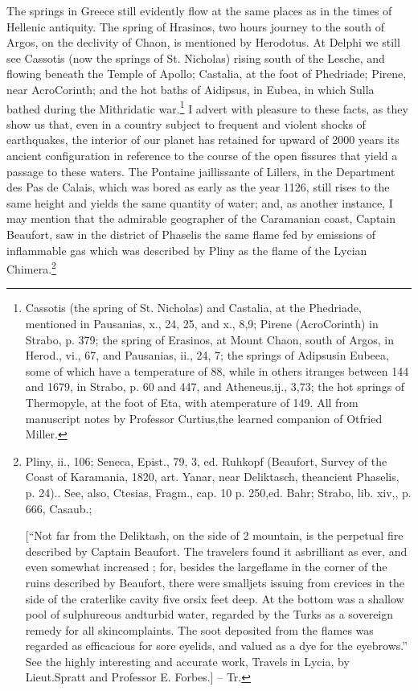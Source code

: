 The springs in Greece still evidently flow at the same places as in the times of Hellenic antiquity. The spring of Hrasinos, two hours journey to the south of Argos, on the declivity of Chaon, is mentioned by Herodotus. At Delphi we still see Cassotis (now the springs of St. Nicholas) rising south of the Lesche, and flowing beneath the Temple of Apollo; Castalia, at the foot of Phedriade; Pirene, near AcroCorinth; and the hot baths of Aidipsus, in Eubea, in which Sulla bathed during the Mithridatic war.\footnote{Cassotis (the spring of St. Nicholas) and Castalia, at the Phedriade, mentioned in Pausanias, x., 24, 25, and x., 8,9; Pirene (AcroCorinth) in Strabo, p. 379; the spring of Erasinos, at Mount Chaon, south of Argos, in Herod., vi., 67, and Pausanias, ii., 24, 7; the springs of Adipsusin Eubeea, some of which have a temperature of 88, while in others itranges between 144 and 1679, in Strabo, p. 60 and 447, and Atheneus,ij., 3,73; the hot springs of Thermopyle, at the foot of Eta, with atemperature of 149. All from manuscript notes by Professor Curtius,the learned companion of Otfried Miller.} I advert with pleasure to these facts, as they show us that, even in a country subject to frequent and violent shocks of earthquakes, the interior of our planet has retained for upward of 2000 years its ancient configuration in reference to the course of the open fissures that yield a passage to these waters. The Pontaine jaillissante of Lillers, in the Department des Pas de Calais, which was bored as early as the year 1126, still rises to the same height and yields the same quantity of water; and, as another instance, I may mention that the admirable geographer of the Caramanian coast, Captain Beaufort, saw in the district of Phaselis the same flame fed by emissions of inflammable gas which was described by Pliny as the flame of the Lycian Chimera.\footnote{Pliny, ii., 106; Seneca, Epist., 79,  3, ed. Ruhkopf (Beaufort, Survey of the Coast of Karamania, 1820, art. Yanar, near Deliktasch, theancient Phaselis, p. 24).. See, also, Ctesias, Fragm., cap. 10 p. 250,ed. Bahr; Strabo, lib. xiv,, p. 666, Casaub.;

[``Not far from the Deliktash, on the side of 2 mountain, is the perpetual fire described by Captain Beaufort. The travelers found it asbrilliant as ever, and even somewhat increased ; for, besides the largeflame in the corner of the ruins described by Beaufort, there were smalljets issuing from crevices in the side of the craterlike cavity five orsix feet deep. At the bottom was a shallow pool of sulphureous andturbid water, regarded by the Turks as a sovereign remedy for all skincomplaints. The soot deposited from the flames was regarded as efficacious for sore eyelids, and valued as a dye for the eyebrows.'' See the highly interesting and accurate work, Travels in Lycia, by Lieut.Spratt and Professor E. Forbes.] -- Tr.
}

